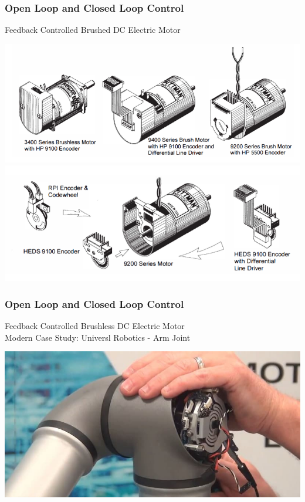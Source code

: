 \documentclass[fleqn]{beamer} %
\newcommand{\sectiontitleII}{Open Loop and Closed Loop Control}
\begin{document}
	\begin{frame} \small
		\frametitle{\sectiontitleII}

		Feedback Controlled Brushed DC Electric Motor

		\includegraphics[scale=0.25]{images/pittman_encoder_01.png} \\
	
		\includegraphics[scale=0.25]{images/pittman_encoder_02.png}	

	\end{frame}

	\begin{frame} \small
		\frametitle{\sectiontitleII}

		Feedback Controlled Brushless DC Electric Motor \\

		Modern Case Study: Universl Robotics - Arm Joint

		\includegraphics[scale=.25]{images/UR3-Joint-Replacement.jpg}
	
	\end{frame}
\end{document}
